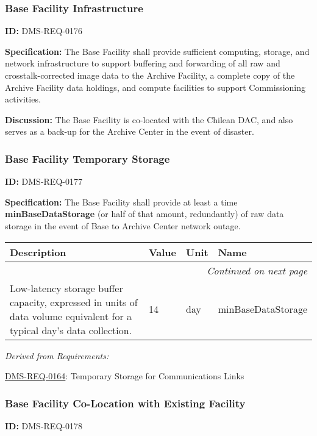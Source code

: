 \documentclass[SE,toc,lsstdraft]{lsstdoc}
\makeatletter
\newcommand{\paramname}[1]{\hspace{0pt}#1}
\newcommand{\unitname}[1]{\hspace{0pt}#1}
\newenvironment{parameters}[0]{%
\setlength\LTleft{0pt}
\setlength\LTright{\fill}
\begin{small}
\begin{longtable}[]{|p{0.5\textwidth}|l|p{0.6in}|p{1.74in}@{}|}

\hline \textbf{Description} & \textbf{Value} & \textbf{Unit} & \textbf{Name} \\ \hline
\endhead

\hline \multicolumn{4}{r}{\emph{Continued on next page}} \\
\endfoot

\hline\hline
\endlastfoot
}{%
\hline
\end{longtable}
\end{small}
}
\makeatother
\begin{document}
\subsubsection{Base Facility Infrastructure}

\label{DMS-REQ-0176}
\textbf{ID:} DMS-REQ-0176

\textbf{Specification:} The Base Facility shall provide sufficient computing, storage, and network infrastructure to support buffering and forwarding of all raw and crosstalk-corrected image data to the Archive Facility, a complete copy of the Archive Facility data holdings, and compute facilities to support Commissioning activities.

\textbf{Discussion:} The Base Facility is co-located with the Chilean DAC, and also serves as a back-up for the Archive Center in the event of disaster.




\subsubsection{Base Facility Temporary Storage}

\label{DMS-REQ-0177}
\textbf{ID:} DMS-REQ-0177

    \textbf{Specification:} The Base Facility shall provide at least a time \textbf{minBaseDataStorage }(or half of that amount, redundantly) of raw data storage in the event of Base to Archive Center network outage.





\begin{parameters}
Low-latency storage buffer capacity, expressed in units of data volume equivalent for a typical day's data collection.
&
14
&
\unitname{%
day
}
&
\paramname{%
minBaseDataStorage
} \\\hline
\end{parameters}




\emph{Derived from Requirements:}

\hyperref[DMS-REQ-0164]{DMS-REQ-0164}:
Temporary Storage for Communications Links \newline


\subsubsection{Base Facility Co-Location with Existing Facility}

\label{DMS-REQ-0178}
\textbf{ID:} DMS-REQ-0178
\end{document}
